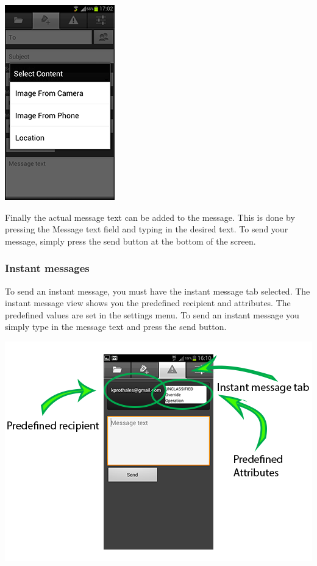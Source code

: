  \begin{center}
    \includegraphics{attachments}
  \end{center}

Finally the actual message text can be added to the message. This is done by pressing the Message text field and typing in the desired text. To send your message, simply press the send button at the bottom of the screen. 
\newpage
\subsubsection{Instant messages}
To send an instant message, you must have the instant message tab selected. The instant message view shows you the predefined recipient and attributes. The predefined values are set in the settings menu. To send an instant message you simply type in the message text and press the send button. 
 \begin{center}
    \includegraphics{instantmessagearrows}
  \end{center}


